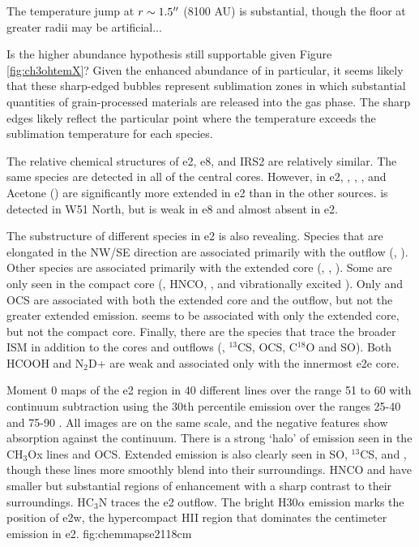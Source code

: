 \documentclass{aa}
\begin{document}
The temperature jump at $r\sim1.5\mbox{$^{\prime\prime}$}$ (8100 AU) is substantial, though
the floor at greater radii may be artificial...

{\color{red} Is the higher abundance hypothesis still supportable given Figure
\ref{fig:ch3ohtemX}?}
Given the enhanced abundance of \methanol in particular, it seems likely that these
sharp-edged bubbles represent sublimation zones in which substantial quantities
of grain-processed materials are released into the gas phase.  The sharp edges
likely reflect the particular point where the temperature exceeds the sublimation
temperature for each species.

The relative chemical structures of e2, e8, and IRS2 are relatively similar.
The same species are detected in all of the central cores.  However, in e2,
\dimethylether, \methylformate, \ethylcyanide, and Acetone (\acetone) are
significantly more extended in e2 than in the other sources.
\gaucheethanol is detected in W51 North, but is weak in e8 and almost absent
in e2.

The substructure of different species in e2 is also revealing.  Species that
are elongated in the NW/SE direction are associated primarily with the outflow
(\cyanoacetylene, \ethylcyanide).  Other species are associated primarily with
the extended core (\methylformate, \dimethylether, \acetone).  Some are only
seen in the compact core (\methyleneamidogen, HNCO, \formamide, and
vibrationally excited \cyanoacetylene).  Only \methanol and OCS are associated
with both the extended core and the outflow, but not the greater extended
emission.  \ketene seems to be associated with only the extended core, but not
the compact core. Finally, there are the species that trace the broader ISM in
addition to the cores and outflows (\formaldehyde, $^{13}$CS, OCS, C$^{18}$O
and SO).  Both HCOOH and N$_2$D+ are weak and associated only with the innermost
e2e core.

{Moment 0 maps of the e2 region in 40 different lines over the range 51 to 60
\kms with continuum subtraction using the 30th percentile emission
over the ranges 25-40 and 75-90 \kms.  All images are on the same scale, and
the negative features show absorption against the continuum.  There
is a strong `halo' of emission seen in the CH$_3$Ox lines and OCS.  Extended
emission is also clearly seen in SO, $^{13}$CS, and \formaldehyde, though these
lines more smoothly blend into their surroundings.  HNCO and \formamide have
smaller but substantial regions of enhancement with a sharp contrast to their
surroundings.  HC$_3$N traces the e2 outflow.  The bright H30$\alpha$ emission
marks the position of e2w, the hypercompact HII region that dominates the
centimeter emission in e2.
}{fig:chemmapse2}{1}{18cm}
\end{document}
